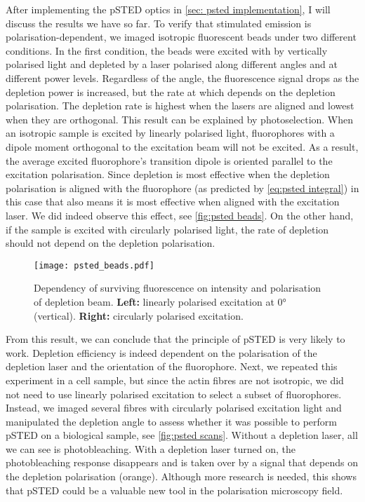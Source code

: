 After implementing the pSTED optics in \autoref{sec: psted implementation}, I will discuss the results we have so far. To verify that stimulated emission is polarisation-dependent, we imaged isotropic fluorescent beads under two different conditions. In the first condition, the beads were excited with by vertically polarised light and depleted by a laser polarised along different angles and at different power levels. Regardless of the angle, the fluorescence signal drops as the depletion power is increased, but the rate at which depends on the depletion polarisation. The depletion rate is highest when the lasers are aligned and lowest when they are orthogonal. This result can be explained by photoselection. When an isotropic sample is excited by linearly polarised light, fluorophores with a dipole moment orthogonal to the excitation beam will not be excited. As a result, the average excited fluorophore's transition dipole is oriented parallel to the excitation polarisation. Since depletion is most effective when the depletion polarisation is aligned with the fluorophore (as predicted by \autoref{eq:psted integral}) in this case that also means it is most effective when aligned with the excitation laser. We did indeed observe this effect, see \autoref{fig:psted beads}. On the other hand, if the sample is excited with circularly polarised light, the rate of depletion should not depend on the depletion polarisation. 

\begin{figure}
	\centering
	\texttt{[image: psted\_beads.pdf]}
	\caption{
		Dependency of surviving fluorescence on intensity and polarisation of depletion beam. \textbf{Left:} linearly polarised excitation at 0° (vertical). \textbf{Right:} circularly polarised excitation. 
	}
	\label{fig:psted beads}
\end{figure}

From this result, we can conclude that the principle of pSTED is very likely to work. Depletion efficiency is indeed dependent on the polarisation of the depletion laser and the orientation of the fluorophore. Next, we repeated this experiment in a cell sample, but since the actin fibres are not isotropic, we did not need to use linearly polarised excitation to select a subset of fluorophores. Instead, we imaged several fibres with circularly polarised excitation light and manipulated the depletion angle to assess whether it was possible to perform pSTED on a biological sample, see \autoref{fig:psted scans}. Without a depletion laser, all we can see is photobleaching. With a depletion laser turned on, the photobleaching response disappears and is taken over by a signal that depends on the depletion polarisation (orange). Although more research is needed, this shows that pSTED could be a valuable new tool in the polarisation microscopy field.


